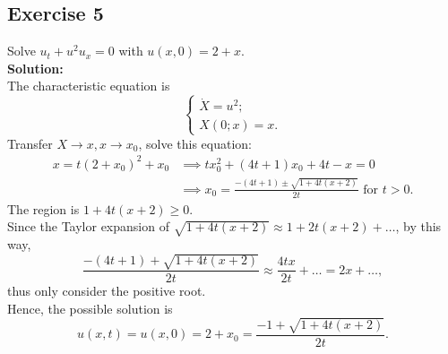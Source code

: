 \documentclass[12pt]{article}%
\begin{document}
\subsection*{Exercise 5}
Solve $u_{t}+u^2u_{x}=0$ with $u(x,0)=2+x$.\\
\textbf{Solution:}\\
The characteristic equation is \begin{equation*}
    \begin{cases}
        \dot{X}=u^2;
        \\
        X(0;x)=x.
    \end{cases}
\end{equation*}
Transfer $X\to x, x\to x_{0}$, solve this equation:
\begin{equation*}
    \begin{split}
        x=t(2+x_{0})^2+x_{0} &\implies tx^2_{0}+(4t+1)x_{0}+4t-x=0\\
        &\implies x_{0}=\frac{-(4t+1)\pm\sqrt{1+4t(x+2)}}{2t} \text{ for } t > 0 .
    \end{split}
\end{equation*}
The region is $ 1+4t(x+2)\ge 0$.\\
Since the Taylor expansion of $ \sqrt{1+4t(x+2)}\approx1+2t(x+2)+\dots$, by this way, \[\frac{-(4t+1)+\sqrt{1+4t(x+2)}}{2t}\approx\frac{4tx}{2t}+\dots=2x+\dots,\]
thus only consider the positive root.\\
Hence, the possible solution is \[u(x,t)=u(x,0)=2+x_{0}=\frac{-1+\sqrt{1+4t(x+2)}}{2t}.\]
\end{document}
